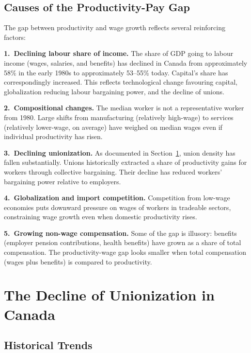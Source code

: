 \subsection{Causes of the Productivity-Pay Gap}

The gap between productivity and wage growth reflects several reinforcing factors:

\textbf{1.\ Declining labour share of income.} The share of GDP going to labour income (wages, salaries, and benefits) has declined in Canada from approximately 58\% in the early 1980s to approximately 53--55\% today. Capital's share has correspondingly increased. This reflects technological change favouring capital, globalization reducing labour bargaining power, and the decline of unions.

\textbf{2.\ Compositional changes.} The median worker is not a representative worker from 1980. Large shifts from manufacturing (relatively high-wage) to services (relatively lower-wage, on average) have weighed on median wages even if individual productivity has risen.

\textbf{3.\ Declining unionization.} As documented in Section~\ref{sec:unions}, union density has fallen substantially. Unions historically extracted a share of productivity gains for workers through collective bargaining. Their decline has reduced workers' bargaining power relative to employers.

\textbf{4.\ Globalization and import competition.} Competition from low-wage economies puts downward pressure on wages of workers in tradeable sectors, constraining wage growth even when domestic productivity rises.

\textbf{5.\ Growing non-wage compensation.} Some of the gap is illusory: benefits (employer pension contributions, health benefits) have grown as a share of total compensation. The productivity-wage gap looks smaller when total compensation (wages plus benefits) is compared to productivity.

\section{The Decline of Unionization in Canada}
\label{sec:unions}

\subsection{Historical Trends}

